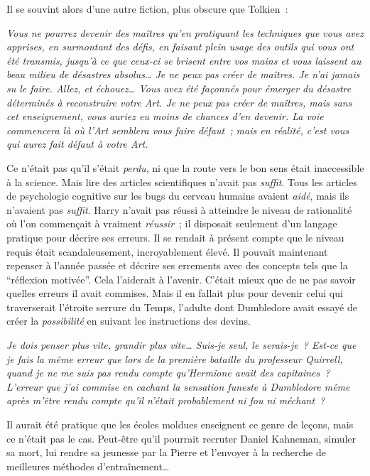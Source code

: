 Il se souvint alors d'une autre fiction, plus obscure que Tolkien~:

\emph{Vous ne pourrez devenir des maîtres qu'en pratiquant les techniques que vous avez apprises, en surmontant des défis, en faisant plein usage des outils qui vous ont été transmis, jusqu'à ce que ceux-ci se brisent entre vos mains et vous laissent au beau milieu de désastres absolus…
Je ne peux pas créer de maîtres.
Je n'ai jamais su le faire.
Allez, et échouez…
Vous avez été façonnés pour émerger du désastre déterminés à reconstruire votre Art.
Je ne peux pas créer de maîtres, mais sans cet enseignement, vous auriez eu moins de chances d'en devenir.
La voie commencera là où l'Art semblera vous faire défaut~; mais en réalité, c'est vous qui aurez fait défaut à votre Art.}

Ce n'était pas qu'il s'était \emph{perdu}, ni que la route vers le bon sens était inaccessible à la science.
Mais lire des articles scientifiques n'avait pas \emph{suffit}.
Tous les articles de psychologie cognitive sur les bugs du cerveau humains avaient \emph{aidé}, mais ils n'avaient pas \emph{suffit}.
Harry n'avait pas réussi à atteindre le niveau de rationalité où l'on commençait à vraiment \emph{réussir}~; il disposait seulement d'un langage pratique pour décrire ses erreurs.
Il se rendait à présent compte que le niveau requis était scandaleusement, incroyablement élevé.
Il pouvait maintenant repenser à l'année passée et décrire ses errements avec des concepts tels que la “réflexion motivée”.
Cela l'aiderait à l'avenir.
C'était mieux que de ne pas savoir quelles erreurs il avait commises.
Mais il en fallait plus pour devenir celui qui traverserait l'étroite serrure du Temps, l'adulte dont Dumbledore avait essayé de créer la \emph{possibilité} en suivant les instructions des devins.

\emph{Je dois penser plus vite, grandir plus vite…
Suis-je seul, le serais-je~?
Est-ce que je fais la même erreur que lors de la première bataille du professeur Quirrell, quand je ne me suis pas rendu compte qu'Hermione avait des capitaines~?
L'erreur que j'ai commise en cachant la sensation funeste à Dumbledore même après m'être rendu compte qu'il n'était probablement ni fou ni méchant~?}

Il aurait été pratique que les écoles moldues enseignent ce genre de leçons, mais ce n'était pas le cas.
Peut-être qu'il pourrait recruter Daniel Kahneman, simuler sa mort, lui rendre sa jeunesse par la Pierre et l'envoyer à la recherche de meilleures méthodes d'entraînement…

